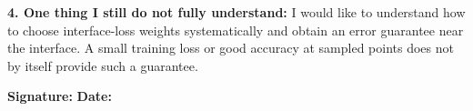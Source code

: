 \begin{formbox}
\textbf{4. One thing I still do not fully understand:}
I would like to understand how to choose interface-loss weights
systematically and obtain an error guarantee near the interface. A small
training loss or good accuracy at sampled points does not by itself provide
such a guarantee.

\vfill
\textbf{Signature:} \underline{\hspace{4.5cm}} \hfill
\textbf{Date:} \underline{\hspace{2.5cm}}
\end{formbox}
